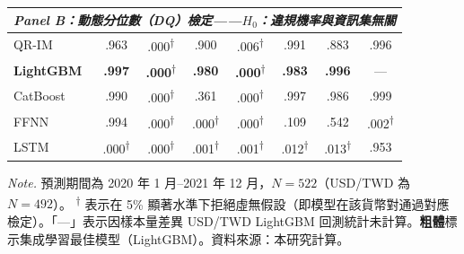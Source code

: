 \begin{table}[htbp]
{\begin{tabular}{lccccccc}
        \hline
        \multicolumn{8}{l}{\textit{Panel B：動態分位數（DQ）檢定——$H_0$：違規機率與資訊集無關}} \\
        \hline
        QR-IM        & .963 & .000\textsuperscript{$\dag$}
                     & .900 & .006\textsuperscript{$\dag$}
                     & .991 & .883 & .996 \\
        \textbf{LightGBM}
                     & \textbf{.997} & \textbf{.000}\textsuperscript{$\dag$}
                     & \textbf{.980} & \textbf{.000}\textsuperscript{$\dag$}
                     & \textbf{.983} & \textbf{.996}
                     & \multicolumn{1}{c}{—} \\
        CatBoost     & .990 & .000\textsuperscript{$\dag$}
                     & .361 & .000\textsuperscript{$\dag$}
                     & .997 & .986 & .999 \\
        FFNN         & .994 & .000\textsuperscript{$\dag$}
                     & .000\textsuperscript{$\dag$}
                     & .000\textsuperscript{$\dag$}
                     & .109 & .542 & .002\textsuperscript{$\dag$} \\
        LSTM         & .000\textsuperscript{$\dag$}
                     & .000\textsuperscript{$\dag$}
                     & .001\textsuperscript{$\dag$}
                     & .001\textsuperscript{$\dag$}
                     & .012\textsuperscript{$\dag$}
                     & .013\textsuperscript{$\dag$}
                     & .953 \\
        \hline
    \end{tabular}
    }
 
    \vspace{3mm}
 
    \begin{minipage}{\textwidth}
        \fontsize{9pt}{13pt}\selectfont
        \textit{Note.} 預測期間為 2020 年 1 月--2021 年 12 月，$N = 522$（USD/TWD 為 $N = 492$）。      \textsuperscript{$\dag$} 表示在 5\% 顯著水準下拒絕虛無假設（即模型在該貨幣對通過對應檢定）。「—」表示因樣本量差異 USD/TWD LightGBM 回測統計未計算。\textbf{粗體}標示集成學習最佳模型（LightGBM）。資料來源：本研究計算。
    \end{minipage}
\end{table}
 
